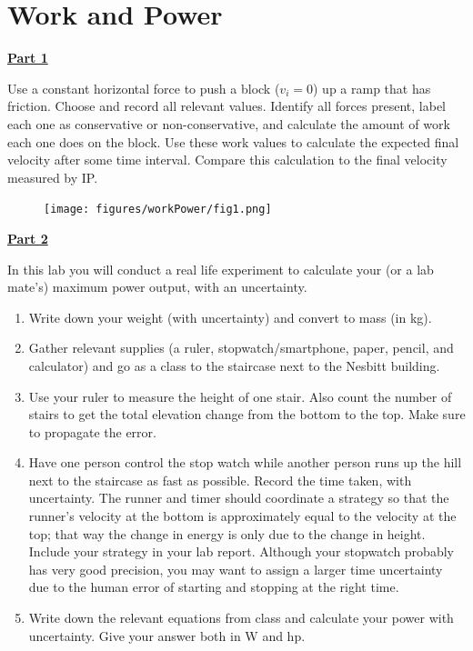 \section{Work and Power}

\underline{\textbf{Part 1}} \par
Use a constant horizontal force to push a block ($v_i = 0$) up a ramp that has friction.
Choose and record all relevant values.
Identify all forces present, label each one as conservative or non-conservative, and calculate the amount of work each one does on the block.
Use these work values to calculate the expected final velocity after some time interval.
Compare this calculation to the final velocity measured by IP.

\begin{figure}[H]
\texttt{[image: figures/workPower/fig1.png]}
\end{figure}


\underline{\textbf{Part 2}} \par
In this lab you will conduct a real life experiment to calculate your (or a lab mate's) maximum power output, with an uncertainty.

\begin{enumerate}
\item Write down your weight (with uncertainty) and convert to mass (in kg).
\item Gather relevant supplies (a ruler, stopwatch/smartphone, paper, pencil, and calculator) and go as a class to the staircase next to the Nesbitt building.
\item Use your ruler to measure the height of one stair. Also count the number of stairs to get the total elevation change from the bottom to the top. Make sure to propagate the error.
\item Have one person control the stop watch while another person runs up the hill next to the staircase as fast as possible. Record the time taken, with uncertainty. The runner and timer should coordinate a strategy so that the runner's velocity at the bottom is approximately equal to the velocity at the top; that way the change in energy is only due to the change in height. Include your strategy in your lab report. Although your stopwatch probably has very good precision, you may want to assign a larger time uncertainty due to the human error of starting and stopping at the right time.
\item Write down the relevant equations from class and calculate your power with uncertainty. Give your answer both in W and hp.
\end{enumerate}

